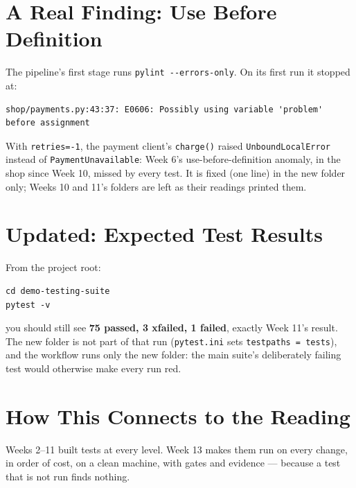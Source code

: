 \documentclass[11pt]{article}
\newcommand{\dd}{-{}-}
\begin{document}
\section{A Real Finding: Use Before Definition}
\label{sec:finding}
The pipeline's first stage runs \texttt{pylint \dd errors-only}. On its
first run it stopped at:
\begin{lstlisting}[style=shellstyle]
shop/payments.py:43:37: E0606: Possibly using variable 'problem' before assignment
\end{lstlisting}
With \texttt{retries=-1}, the payment client's \texttt{charge()} raised
\texttt{UnboundLocalError} instead of \texttt{PaymentUnavailable}: Week
6's use-before-definition anomaly, in the shop since Week 10, missed by
every test. It is fixed (one line) in the new folder only; Weeks 10 and
11's folders are left as their readings printed them.

\section{Updated: Expected Test Results}
From the project root:
\begin{lstlisting}[style=shellstyle]
cd demo-testing-suite
pytest -v
\end{lstlisting}
you should still see \textbf{75 passed, 3 xfailed, 1 failed}, exactly
Week 11's result. The new folder is not part of that run
(\texttt{pytest.ini} sets \texttt{testpaths = tests}), and the workflow
runs only the new folder: the main suite's deliberately failing test
would otherwise make every run red.

\section{How This Connects to the Reading}
\begin{keyidea}
Weeks 2--11 built tests at every level. Week 13 makes them run on every
change, in order of cost, on a clean machine, with gates and evidence
--- because a test that is not run finds nothing.
\end{keyidea}

\end{document}
